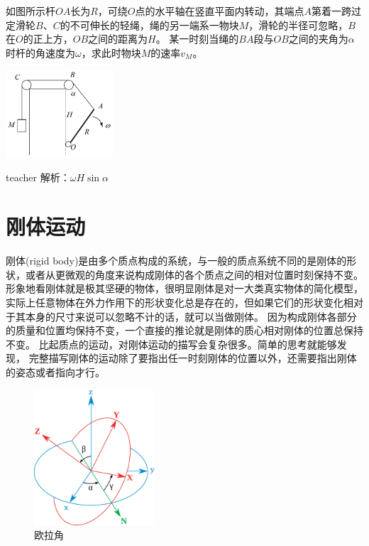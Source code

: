 \begin{example}
如图所示杆$OA$长为$R$，可绕$O$点的水平轴在竖直平面内转动，其端点$A$第着一跨过定滑轮$B$、$C$的不可伸长的轻绳，绳的另一端系一物块$M$，滑轮的半径可忽略，$B$在$O$的正上方，$OB$之间的距离为$H$。
某一时刻当绳的$BA$段与$OB$之间的夹角为$ \alpha$时杆的角速度为$ \omega$，求此时物块$M$的速率$v_M$。

\begin{flushright}
\includegraphics[width = 0.3\textwidth]{images/motion-45.pdf} 
\end{flushright}
\begin{taggedblock}{teacher}
\noindent
解析：$\omega H\sin\alpha$
\end{taggedblock}
\end{example}






\section{刚体运动}


刚体(rigid body)是由多个质点构成的系统，与一般的质点系统不同的是刚体的形状，或者从更微观的角度来说构成刚体的各个质点之间的相对位置时刻保持不变。
形象地看刚体就是极其坚硬的物体，很明显刚体是对一大类真实物体的简化模型，实际上任意物体在外力作用下的形状变化总是存在的，但如果它们的形状变化相对于其本身的尺寸来说可以忽略不计的话，就可以当做刚体。
因为构成刚体各部分的质量和位置均保持不变，一个直接的推论就是刚体的质心相对刚体的位置总保持不变。
比起质点的运动，对刚体运动的描写会复杂很多。简单的思考就能够发现， 完整描写刚体的运动除了要指出任一时刻刚体的位置以外，还需要指出刚体的姿态或者指向才行。




 \begin{figure}
 \centering
  \includegraphics[width=0.4\textwidth]{images/rb-Eulerangles.pdf} 
   \caption{欧拉角}
    \label{rig: motion-euler-angle}
 \end{figure}
 
